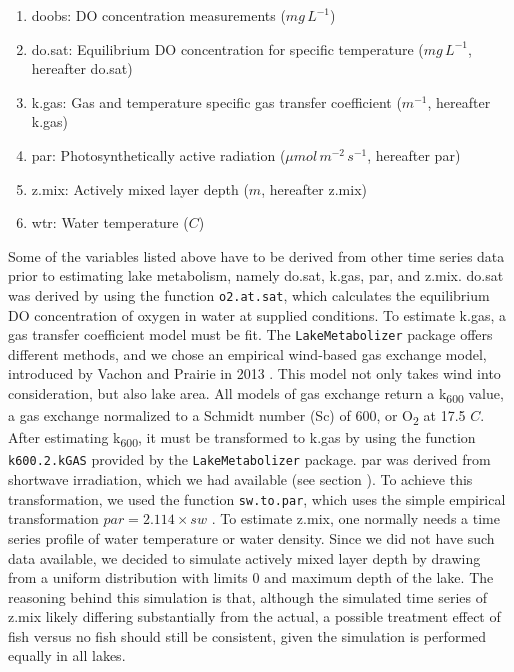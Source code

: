 \documentclass[11pt,lineno]{manuscript}\usepackage[]{graphicx}\usepackage[]{xcolor}
\begin{document}
\begin{enumerate}
\item doobs: DO concentration measurements ($mg\,L^{-1}$)
\item do.sat: Equilibrium DO concentration for specific temperature ($mg\,L^{-1}$, hereafter do.sat)
\item k.gas: Gas and temperature specific gas transfer coefficient ($m^{-1}$, hereafter k.gas)
\item par: Photosynthetically active radiation ($\mu{}mol\,m^{-2}\,s^{-1}$, hereafter par)
\item z.mix: Actively mixed layer depth ($m$, hereafter z.mix)
\item wtr: Water temperature (\textdegree{}$C$)
\end{enumerate}

Some of the variables listed above have to be derived from other time series data prior
to estimating lake metabolism,
namely do.sat, k.gas, par, and z.mix.
do.sat was derived by using the function \texttt{o2.at.sat}, which calculates
the equilibrium DO concentration of oxygen in water at supplied conditions.
To estimate k.gas, a gas transfer coefficient model must be fit.
The \texttt{LakeMetabolizer} package offers different methods, and we chose
an empirical wind-based gas exchange model, introduced by Vachon and
Prairie in 2013 \citep{Vachon:2013}. This model not only takes wind into
consideration, but also lake area.
All models of gas exchange 
return a k\textsubscript{600} value, a gas exchange normalized to a Schmidt 
number (Sc) of 600, or O\textsubscript{2} at 17.5 \textdegree{}$C$.
After estimating k\textsubscript{600}, it must be transformed to k.gas by using the
function \texttt{k600.2.kGAS} provided by the \texttt{LakeMetabolizer}
package. par was derived from shortwave irradiation,
which we had available (see section ).
To achieve this transformation, we used the function \texttt{sw.to.par},
which uses the simple empirical transformation $par = 2.114 \times sw$ \citep{Britton:1976}.
To estimate z.mix, one normally needs a time series profile of water temperature
or water density. Since we did not have such data available, we decided to
simulate actively mixed layer depth by drawing from a uniform distribution
with limits 0 and maximum depth of the lake. The reasoning behind this simulation
is that, although the simulated time series of z.mix likely differing substantially
from the actual, a possible treatment effect of fish versus no fish should still be
consistent, given the simulation is performed equally in all lakes.\smallskip
\end{document}
